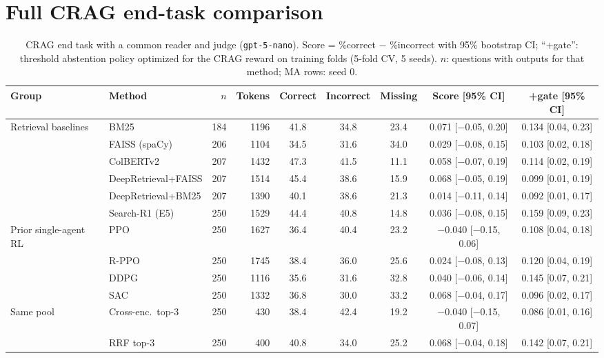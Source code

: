\documentclass[sigconf,anonymous]{aamas}
\theoremstyle{plain}
\theoremstyle{definition}
\begin{document}
\section{Full CRAG end-task comparison}\label{app:crag}

\begin{table}[t]
\centering\small
\caption{CRAG end task with a common reader and judge (\texttt{gpt-5-nano}). Score = \%correct $-$ \%incorrect with 95\% bootstrap CI; ``+gate'': threshold abstention policy optimized for the CRAG reward on training folds (5-fold CV, 5 seeds). $n$: questions with outputs for that method; MA rows: seed 0.}
\label{tab:crag-full}
\begin{tabular}{ll r r ccc cc}
\toprule
Group & Method & $n$ & Tokens & Correct & Incorrect & Missing & Score [95\% CI] & +gate [95\% CI] \\
\midrule
\multirow{6}{*}{Retrieval baselines}
 & BM25 & 184 & 1196 & 41.8 & 34.8 & 23.4 & 0.071 [$-$0.05, 0.20] & 0.134 [0.04, 0.23] \\
 & FAISS (spaCy) & 206 & 1104 & 34.5 & 31.6 & 34.0 & 0.029 [$-$0.08, 0.15] & 0.103 [0.02, 0.18] \\
 & ColBERTv2 & 207 & 1432 & 47.3 & 41.5 & 11.1 & 0.058 [$-$0.07, 0.19] & 0.114 [0.02, 0.19] \\
 & DeepRetrieval+FAISS & 207 & 1514 & 45.4 & 38.6 & 15.9 & 0.068 [$-$0.05, 0.19] & 0.099 [0.01, 0.19] \\
 & DeepRetrieval+BM25 & 207 & 1390 & 40.1 & 38.6 & 21.3 & 0.014 [$-$0.11, 0.14] & 0.092 [0.01, 0.17] \\
 & Search-R1 (E5) & 250 & 1529 & 44.4 & 40.8 & 14.8 & 0.036 [$-$0.08, 0.15] & 0.159 [0.09, 0.23] \\
\midrule
\multirow{4}{*}{Prior single-agent RL}
 & PPO & 250 & 1627 & 36.4 & 40.4 & 23.2 & $-$0.040 [$-$0.15, 0.06] & 0.108 [0.04, 0.18] \\
 & R-PPO & 250 & 1745 & 38.4 & 36.0 & 25.6 & 0.024 [$-$0.08, 0.13] & 0.120 [0.04, 0.19] \\
 & DDPG & 250 & 1116 & 35.6 & 31.6 & 32.8 & 0.040 [$-$0.06, 0.14] & 0.145 [0.07, 0.21] \\
 & SAC & 250 & 1332 & 36.8 & 30.0 & 33.2 & 0.068 [$-$0.04, 0.17] & 0.096 [0.02, 0.17] \\
\midrule
\multirow{3}{*}{Same pool}
 & Cross-enc.\ top-3 & 250 & 430 & 38.4 & 42.4 & 19.2 & $-$0.040 [$-$0.15, 0.07] & 0.086 [0.01, 0.16] \\
 & RRF top-3 & 250 & 400 & 40.8 & 34.0 & 25.2 & 0.068 [$-$0.04, 0.18] & 0.142 [0.07, 0.21] \\

\end{tabular}
\end{table}
\end{document}
